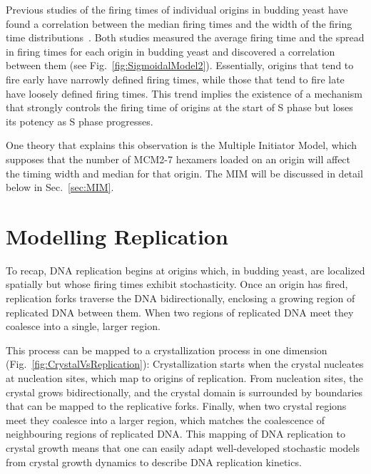 		Previous studies of the firing times of individual origins in budding yeast have found a correlation between the median firing times and the width of the firing time distributions~\cite{ScottsPaper,StochasticTermination}.
		Both studies measured the average firing time and the spread in firing times for each origin in budding yeast and discovered a correlation between them (see Fig.~\ref{fig:SigmoidalModel2}).
		Essentially, origins that tend to fire early have narrowly defined firing times, while those that tend to fire late have loosely defined firing times.
		This trend implies the existence of a mechanism that strongly controls the firing time of origins at the start of S phase but loses its potency as S phase progresses.
		
		One theory that explains this observation is the Multiple Initiator Model, which supposes that the number of MCM2-7 hexamers loaded on an origin will affect the timing width and median for that origin.
		The MIM will be discussed in detail below in Sec.~\ref{sec:MIM}.
		
		
	\section{Modelling Replication}
	\label{sec:Modelling}
	
	To recap, DNA replication begins at origins which, in budding yeast, are localized spatially but whose firing times exhibit stochasticity.
	Once an origin has fired, replication forks traverse the DNA bidirectionally, enclosing a growing region of replicated DNA between them.
	When two regions of replicated DNA meet they coalesce into a single, larger region.
	
	This process can be mapped to a crystallization process in one dimension (Fig.~\ref{fig:CrystalVsReplication}):
	Crystallization starts when the crystal nucleates at nucleation sites, which map to origins of replication.
	From nucleation sites, the crystal grows bidirectionally, and the crystal domain is surrounded by boundaries that can be mapped to the replicative forks.
	Finally, when two crystal regions meet they coalesce into a larger region, which matches the coalescence of neighbouring regions of replicated DNA.
	This mapping of DNA replication to crystal growth means that one can easily adapt well-developed stochastic models from crystal growth dynamics to describe DNA replication kinetics.
	
